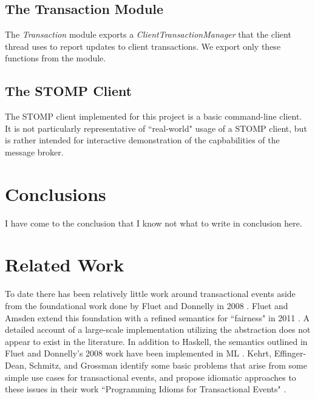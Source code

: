 \documentclass[conference, letterpaper]{IEEEtran}
\begin{document}
\subsection{The Transaction Module}

The \textit{Transaction} module exports a \textit{ClientTransactionManager} that the client thread uses to report updates to client transactions. We export only these functions from the module.

\subsection{The STOMP Client}

The STOMP client implemented for this project is a basic command-line client. It is not particularly representative of ``real-world" usage of a STOMP client, but is rather intended for interactive demonstration of the capbabilities of the message broker.

\section{Conclusions}

I have come to the conclusion that I know not what to write in conclusion here. 

\section{Related Work}
To date there has been relatively little work around transactional events aside from the foundational work done by
Fluet and Donnelly in 2008 \cite{te:original}. Fluet and Amsden extend this foundation with a refined semantics  for ``fairness" in 2011 \cite{te:fairness}.
A detailed account of a large-scale implementation utilizing the abstraction does not appear to exist in the literature. 
In addition to Haskell, the semantics outlined in Fluet and Donnelly's 2008 work have been implemented in ML \cite{te:ml}. 
Kehrt, Effinger-Dean, Schmitz, and Grossman identify some basic problems that arise from some simple use cases for
transactional events, and propose idiomatic approaches to these issues in their work ``Programming Idioms for Transactional Events" \cite{te:idioms}.  



\end{document}
